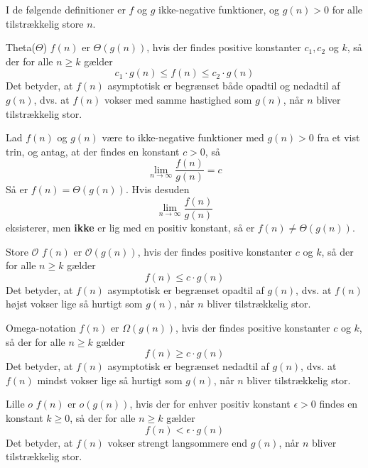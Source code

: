 
I de følgende definitioner er $f$ og $g$ ikke-negative funktioner, og $g(n)>0$ for alle tilstrækkelig store $n$.

\begin{definition}{Theta(\(\Theta\))}
    $f(n)$ er $\Theta(g(n))$, hvis der findes positive konstanter $c_1, c_2$ og $k$, så der for alle $n \geq k$ gælder
    \medskip
    \[
    c_1 \cdot g(n) \leq f(n) \leq c_2 \cdot g(n)
    \]
    \medskip
Det betyder, at $f(n)$ asymptotisk er begrænset både opadtil og nedadtil af $g(n)$, dvs. at $f(n)$ vokser med samme hastighed som $g(n)$, når $n$ bliver tilstrækkelig stor.
\end{definition}

\begin{proposition} 
    Lad $f(n)$ og $g(n)$ være to ikke-negative funktioner med $g(n)>0$ fra et vist trin, og antag, at der findes en konstant $c>0$, så
    \medskip
    \[
    \lim _{n \rightarrow \infty} \frac{f(n)}{g(n)}=c
    \]
    \medskip
    Så er $f(n)=\Theta(g(n))$. Hvis desuden
    \medskip
    \[
    \lim _{n \rightarrow \infty} \frac{f(n)}{g(n)}
    \]
    \medskip
    eksisterer, men \textbf{ikke} er lig med en positiv konstant, så er $f(n) \neq \Theta(g(n))$.
\end{proposition}

\begin{definition}{Store $\mathcal{O}$}
    $f(n)$ er $\mathcal{O}(g(n))$, hvis der findes positive konstanter $c$ og $k$, så der for alle $n \geq k$ gælder
    \medskip
    \[
    f(n) \leq c \cdot g(n)
    \]
    \medskip
    Det betyder, at $f(n)$ asymptotisk er begrænset opadtil af $g(n)$, dvs. at $f(n)$ højst vokser lige så hurtigt som $g(n)$, når $n$ bliver tilstrækkelig stor.
\end{definition}

\begin{definition}{Omega-notation}
    $f(n)$ er $\Omega(g(n))$, hvis der findes positive konstanter $c$ og $k$, så der for alle $n \geq k$ gælder
    \medskip
    \[
    f(n) \geq c \cdot g(n)
    \]
    \medskip
    Det betyder, at $f(n)$ asymptotisk er begrænset nedadtil af $g(n)$, dvs. at $f(n)$ mindst vokser lige så hurtigt som $g(n)$, når $n$ bliver tilstrækkelig stor.
\end{definition}

\begin{definition}{Lille $o$}
    $f(n)$ er $o(g(n))$, hvis der for enhver positiv konstant $\epsilon > 0$ findes en konstant $k \geq 0$, så der for alle $n \geq k$ gælder
    \medskip
    \[
    f(n) < \epsilon \cdot g(n)
    \]
    \medskip
    Det betyder, at $f(n)$ vokser strengt langsommere end $g(n)$, når $n$ bliver tilstrækkelig stor.
    
\end{definition}

